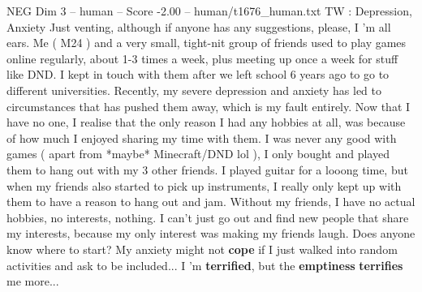 \begin{textsample}{NEG Dim 3 – human – Score -2.00 – human/t1676\_human.txt}  \label{ex:f3_neg_039}
TW : Depression, Anxiety Just venting, although if anyone has any suggestions, please, I 'm all ears.
Me ( M24 ) and a very small, tight-nit group of friends used to play games online regularly, about 1-3 times a week, plus meeting up once a week for stuff like DND.
I kept in touch with them after we left school 6 years ago to go to different universities.
Recently, my severe depression and anxiety has led to circumstances that has pushed them away, which is my fault entirely.
Now that I have no one, I realise that the only reason I had any hobbies at all, was because of how much I enjoyed sharing my time with them.
I was never any good with games ( apart from *maybe* Minecraft/DND lol ), I only bought and played them to hang out with my 3 other friends.
I played guitar for a looong time, but when my friends also started to pick up instruments, I really only kept up with them to have a reason to hang out and jam.
Without my friends, I have no actual hobbies, no interests, nothing.
I can't just go out and find new people that share my interests, because my only interest was making my friends laugh.
Does anyone know where to start?
My anxiety might not \textbf{cope} if I just walked into random activities and ask to be included...
I 'm \textbf{terrified}, but the \textbf{emptiness} \textbf{terrifies} me more...

\end{textsample}
